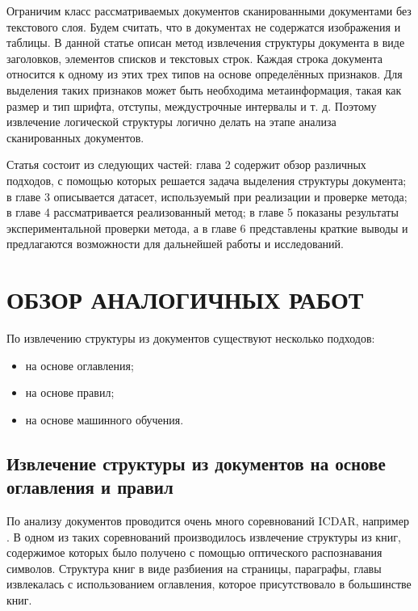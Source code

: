 \documentclass[10pt, a4paper]{ieeeconf}
\begin{document}
Ограничим класс рассматриваемых документов сканированными документами без текстового слоя. Будем считать, что в документах не содержатся изображения и таблицы. В данной статье описан метод извлечения структуры документа в виде заголовков, элементов списков и текстовых строк. Каждая строка документа относится к одному из этих трех типов на основе определённых признаков. Для выделения таких признаков может быть необходима метаинформация, такая как размер и тип шрифта, отступы, междустрочные интервалы и т. д. Поэтому извлечение логической структуры логично делать на этапе анализа сканированных документов.

Статья состоит из следующих частей: глава 2 содержит обзор различных подходов, с помощью которых решается задача выделения структуры документа; в главе 3 описывается датасет, используемый при реализации и проверке метода; в главе 4 рассматривается реализованный метод; в главе 5 показаны результаты экспериментальной проверки метода, а в главе 6 представлены краткие выводы и предлагаются возможности для дальнейшей работы и исследований.

\section{ОБЗОР АНАЛОГИЧНЫХ РАБОТ}

По извлечению структуры из документов существуют несколько подходов:
\begin{itemize}
\item на основе оглавления;
\item на основе правил;
\item на основе машинного обучения.
\end{itemize}

\subsection{Извлечение структуры из документов на основе оглавления и правил}

По анализу документов проводится очень много соревнований ICDAR, например \cite{link1,link2,link3}. В одном из таких соревнований \cite{link1} производилось извлечение структуры из книг, содержимое которых было получено с помощью оптического распознавания символов. Структура книг в виде разбиения на страницы, параграфы, главы извлекалась с использованием оглавления, которое присутствовало в большинстве книг. 
\end{document}
